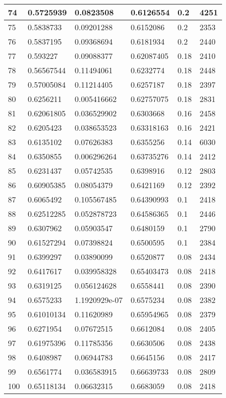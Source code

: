 \begin{longtable}{|l|l|l|l|l|l|}
74 & 0.5725939 & 0.0823508 & 0.6126554 & 0.2 & 4251 \\ \hline 
75 & 0.5838733 & 0.09201288 & 0.6152086 & 0.2 & 2353 \\ \hline 
76 & 0.5837195 & 0.09368694 & 0.6181934 & 0.2 & 2440 \\ \hline 
77 & 0.593227 & 0.09088377 & 0.62087405 & 0.18 & 2410 \\ \hline 
78 & 0.56567544 & 0.11494061 & 0.6232774 & 0.18 & 2448 \\ \hline 
79 & 0.57005084 & 0.11214405 & 0.6257187 & 0.18 & 2397 \\ \hline 
80 & 0.6256211 & 0.005416662 & 0.62757075 & 0.18 & 2831 \\ \hline 
81 & 0.62061805 & 0.036529902 & 0.6303668 & 0.16 & 2458 \\ \hline 
82 & 0.6205423 & 0.038653523 & 0.63318163 & 0.16 & 2421 \\ \hline 
83 & 0.6135102 & 0.07626383 & 0.6355256 & 0.14 & 6030 \\ \hline 
84 & 0.6350855 & 0.006296264 & 0.63735276 & 0.14 & 2412 \\ \hline 
85 & 0.6231437 & 0.05742535 & 0.6398916 & 0.12 & 2803 \\ \hline 
86 & 0.60905385 & 0.08054379 & 0.6421169 & 0.12 & 2392 \\ \hline 
87 & 0.6065492 & 0.105567485 & 0.64390993 & 0.1 & 2418 \\ \hline 
88 & 0.62512285 & 0.052878723 & 0.64586365 & 0.1 & 2446 \\ \hline 
89 & 0.6307962 & 0.05903547 & 0.6480159 & 0.1 & 2790 \\ \hline 
90 & 0.61527294 & 0.07398824 & 0.6500595 & 0.1 & 2384 \\ \hline 
91 & 0.6399297 & 0.03890099 & 0.6520877 & 0.08 & 2434 \\ \hline 
92 & 0.6417617 & 0.039958328 & 0.65403473 & 0.08 & 2418 \\ \hline 
93 & 0.6319125 & 0.056124628 & 0.6558441 & 0.08 & 2390 \\ \hline 
94 & 0.6575233 & 1.1920929e-07 & 0.6575234 & 0.08 & 2382 \\ \hline 
95 & 0.61010134 & 0.11620989 & 0.65954965 & 0.08 & 2379 \\ \hline 
96 & 0.6271954 & 0.07672515 & 0.6612084 & 0.08 & 2405 \\ \hline 
97 & 0.61975396 & 0.11785356 & 0.6630506 & 0.08 & 2438 \\ \hline 
98 & 0.6408987 & 0.06944783 & 0.6645156 & 0.08 & 2417 \\ \hline 
99 & 0.6561774 & 0.036583915 & 0.66639733 & 0.08 & 2809 \\ \hline 
100 & 0.65118134 & 0.06632315 & 0.6683059 & 0.08 & 2418 \\ \hline 
\end{longtable}